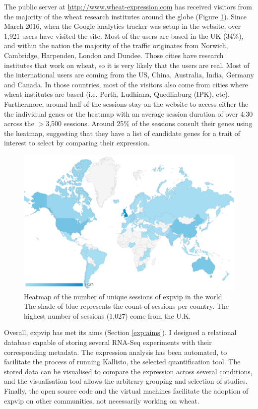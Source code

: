 The public server at \url{http://www.wheat-expression.com} has received visitors from the majority of the wheat research institutes around the globe (Figure \ref{fig:exp:users}). 
Since March 2016, when the Google analytics tracker was setup in the website, over 1,921 users have visited the site. 
Most of the users are based in the UK (34\%), and within the nation the majority of the traffic originates from Norwich, Cambridge, Harpenden, London and Dundee. 
Those cities have research institutes that work on wheat, so it is very likely that the users are real. 
Most of the international users are coming from the US, China, Australia, India, Germany and Canada. 
In those countries, most of the visitors also come from cities where wheat institutes are based (i.e. Perth, Ludhiana, Quedlinburg (IPK), etc). 
Furthermore, around half of the sessions stay on the website to access either the the individual genes or the heatmap  with an average session duration of over 4:30 across the $>$3,500 sessions. 
Around 25\% of the sessions consult their genes using the heatmap, suggesting that they have a list of candidate genes for a trait of interest to select by comparing their expression.

\begin{figure}
\includegraphics[width=1\textwidth]{expVIP/Figures/WorldSessions.png}
\caption{Heatmap of the number of unique sessions of \gls{expvip} in the world. The shade of blue represents the count of sessions per country. The highest number of sessions (1,027) come from the U.K. }
\label{fig:exp:users}
\end{figure}

Overall, \gls{expvip} has met its aims (Section \ref{exp:aims}). 
I designed a relational database capable of storing several RNA-Seq experiments with their corresponding metadata. 
The expression analysis has been automated, to facilitate the process of running Kallisto, the selected quantification tool. 
The stored data can be visualised to compare the expression across several conditions, and the visualisation tool allows the arbitrary grouping and selection of studies. 
Finally, the open source code and the virtual machines facilitate the adoption of \gls{expvip} on other communities, not necessarily working on wheat. 
